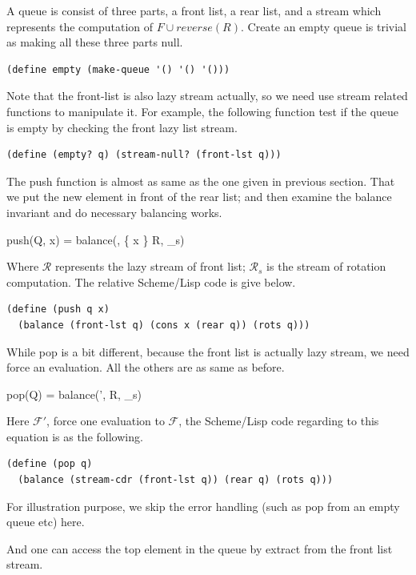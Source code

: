 \documentclass[UTF8]{article}
\begin{document}
A queue is consist of three parts, a front list, a rear list,
and a stream which represents the computation of $F \cup reverse(R)$.
Create an empty queue is trivial as making all these three parts
null.

\begin{lstlisting}
(define empty (make-queue '() '() '()))
\end{lstlisting}

Note that the front-list is also lazy stream actually, so we need use
stream related functions to manipulate it. For example, the following
function test if the queue is empty by checking the front lazy list stream.

\begin{lstlisting}
(define (empty? q) (stream-null? (front-lst q)))
\end{lstlisting}

The push function is almost as same as the one given in previous section.
That we put the new element in front of the rear list; and then examine
the balance invariant and do necessary balancing works.

\be
push(Q, x) = balance(, \{ x \} \cup R, _s)
\ee

Where $\mathcal{R}$ represents the lazy stream of front list; $\mathcal{R}_s$ is
the stream of rotation computation. The relative Scheme/Lisp
code is give below.

\begin{lstlisting}
(define (push q x)
  (balance (front-lst q) (cons x (rear q)) (rots q)))
\end{lstlisting}

While pop is a bit different, because the front list is actually lazy stream,
we need force an evaluation. All the others are as same as before.

\be
pop(Q) = balance(', R, _s)
\ee

Here $\mathcal{F}'$, force one evaluation to $\mathcal{F}$, the Scheme/Lisp
code regarding to this equation is as the following.

\begin{lstlisting}
(define (pop q)
  (balance (stream-cdr (front-lst q)) (rear q) (rots q)))
\end{lstlisting}

For illustration purpose, we skip the error handling (such as pop from
an empty queue etc) here.

And one can access the top element in the queue by extract from
the front list stream.
\end{document}
